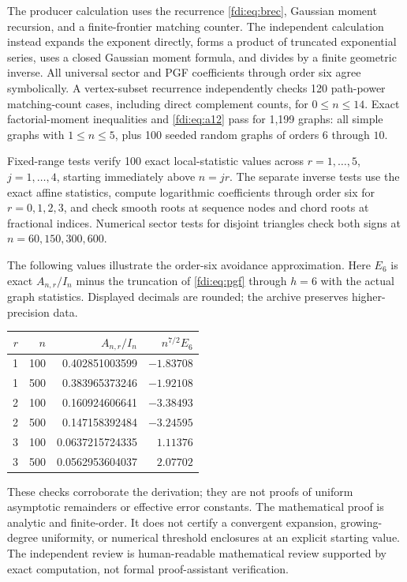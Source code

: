 \documentclass[11pt,letterpaper]{article}
\theoremstyle{remark}\newtheorem{remark}[theorem]{Remark}
\begin{document}
The producer calculation uses the recurrence \eqref{fdi:eq:brec}, Gaussian moment recursion, and a finite-frontier matching counter. The independent calculation instead expands the exponent directly, forms a product of truncated exponential series, uses a closed Gaussian moment formula, and divides by a finite geometric inverse. All universal sector and PGF coefficients through order six agree symbolically. A vertex-subset recurrence independently checks 120 path-power matching-count cases, including direct complement counts, for $0\le n\le14$. Exact factorial-moment inequalities and \eqref{fdi:eq:a12} pass for 1,199 graphs: all simple graphs with $1\le n\le5$, plus 100 seeded random graphs of orders $6$ through $10$.

Fixed-range tests verify 100 exact local-statistic values across $r=1,\ldots,5$, $j=1,\ldots,4$, starting immediately above $n=jr$. The separate inverse tests use the exact affine statistics, compute logarithmic coefficients through order six for $r=0,1,2,3$, and check smooth roots at sequence nodes and chord roots at fractional indices. Numerical sector tests for disjoint triangles check both signs at $n=60,150,300,600$.

The following values illustrate the order-six avoidance approximation. Here $E_6$ is exact $A_{n,r}/I_n$ minus the truncation of \eqref{fdi:eq:pgf} through $h=6$ with the actual graph statistics. Displayed decimals are rounded; the archive preserves higher-precision data.
\begin{center}
\begin{tabular}{rrrr}
\toprule
$r$&$n$&$A_{n,r}/I_n$&$n^{7/2}E_6$\\
\midrule
1&100&0.402851003599&$-1.83708$\\
1&500&0.383965373246&$-1.92108$\\
2&100&0.160924606641&$-3.38493$\\
2&500&0.147158392484&$-3.24595$\\
3&100&0.0637215724335&$1.11376$\\
3&500&0.0562953604037&$2.07702$\\
\bottomrule
\end{tabular}
\end{center}
These checks corroborate the derivation; they are not proofs of uniform asymptotic remainders or effective error constants. The mathematical proof is analytic and finite-order. It does not certify a convergent expansion, growing-degree uniformity, or numerical threshold enclosures at an explicit starting value. The independent review is human-readable mathematical review supported by exact computation, not formal proof-assistant verification.
\end{document}
